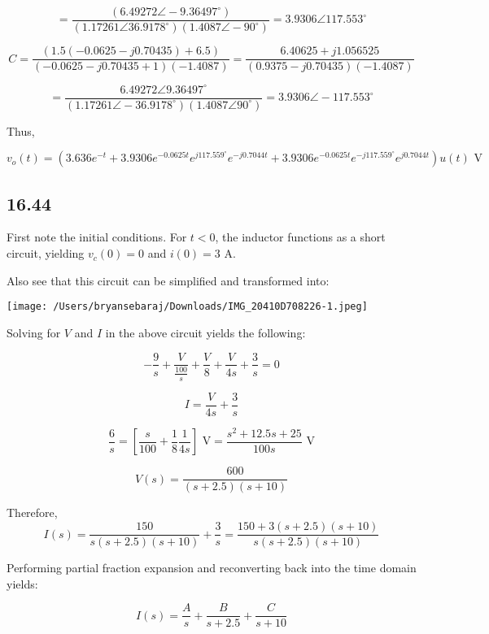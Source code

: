 \documentclass{article}
\begin{document}
\[
= \frac{(6.49272 \angle -9.36497^\circ)}{(1.17261 \angle 36.9178^\circ)(1.4087 \angle -90^\circ)} = 3.9306 \angle 117.553^\circ
\]

\[
C = \frac{(1.5(-0.0625 - j0.70435) + 6.5)}{(-0.0625 - j0.70435 + 1)(-1.4087)} = \frac{6.40625 + j1.056525}{(0.9375 - j0.70435)(-1.4087)}
\]

\[
= \frac{6.49272 \angle 9.36497^\circ}{(1.17261 \angle -36.9178^\circ)(1.4087 \angle 90^\circ)} = 3.9306 \angle -117.553^\circ
\]

Thus,

\[
v_o(t) = (3.636 e^{-t} + 3.9306 e^{-0.0625t}e^{j117.559^\circ} e^{-j0.7044t} + 3.9306 e^{-0.0625t}e^{-j117.559^\circ} e^{j0.7044t})u(t) \text{ V}
\]
%
%

\subsection*{16.44}

First note the initial conditions. For $t<0$, the inductor functions as a short circuit, yielding $v_c(0)=0$ and $i(0)=3$ A.

\noindent Also see that this circuit can be simplified and transformed into: 

\begin{center}
\texttt{[image: /Users/bryansebaraj/Downloads/IMG\_20410D708226-1.jpeg]}
\end{center}

\noindent Solving for $V$ and $I$ in the above circuit yields the following:

$$-\frac9s + \frac{V}{\frac{100}{s}}+\frac{V}{8} + \frac{V}{4s} + \frac3s = 0$$

    $$I=\frac{V}{4s} + \frac3s$$


$$\frac6s = \left[\frac{s}{100} + \frac18 \frac{1}{4s}\right] \text{ V} = \frac{s^2 + 12.5s + 25}{100 s} \text{ V}$$

$$V(s)=\frac{600}{(s+2.5)(s+10)}$$

\noindent Therefore, $$I(s)=\frac{150}{s(s+2.5)(s+10)} + \frac3s=\frac{150 + 3(s+2.5)(s+10)}{s(s+2.5)(s+10)}$$

\noindent Performing partial fraction expansion and reconverting back into the time domain yields:

$$I(s)=\frac{A}{s} + \frac{B}{s+2.5} + \frac{C}{s+10}$$
\end{document}
